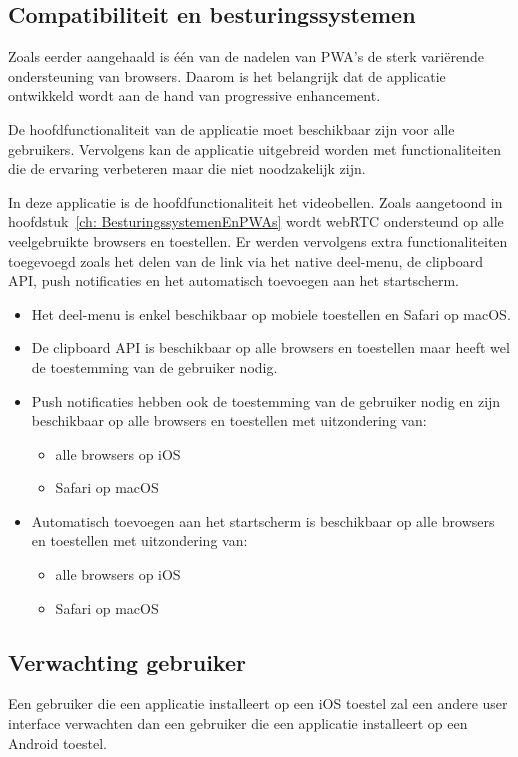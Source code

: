 	\subsection{Compatibiliteit en besturingssystemen}
		Zoals eerder aangehaald is één van de nadelen van PWA's de sterk variërende ondersteuning van browsers. Daarom is het belangrijk dat de applicatie ontwikkeld wordt aan de hand van progressive enhancement. 
		
		De hoofdfunctionaliteit van de applicatie moet beschikbaar zijn voor alle gebruikers. Vervolgens kan de applicatie uitgebreid worden met functionaliteiten die de ervaring verbeteren maar die niet noodzakelijk zijn.
		
		In deze applicatie is de hoofdfunctionaliteit het videobellen. Zoals aangetoond in hoofdstuk~\ref{ch: BesturingssystemenEnPWAs} wordt webRTC ondersteund op alle veelgebruikte browsers en toestellen. Er werden vervolgens extra functionaliteiten toegevoegd zoals het delen van de link via het native deel-menu, de clipboard API, push notificaties en het automatisch toevoegen aan het startscherm.
		\begin{itemize}
	  		\item Het deel-menu is enkel beschikbaar op mobiele toestellen en Safari op macOS.
	  		\item De clipboard API is beschikbaar op alle browsers en toestellen maar heeft wel de toestemming van de gebruiker nodig.
	  		\item Push notificaties hebben ook de toestemming van de gebruiker nodig en zijn beschikbaar op alle browsers en toestellen met uitzondering van:
	  				\begin{itemize}
	  			  		\item alle browsers op iOS
	  			  		\item Safari op macOS
	  		 		\end{itemize}	
  			\item Automatisch toevoegen aan het startscherm is beschikbaar op alle browsers en toestellen met uitzondering van:
	  				\begin{itemize}
	  			  		\item alle browsers op iOS
	  			  		\item Safari op macOS
	  		 		\end{itemize}	
 		\end{itemize}
 		
	\newpage		
	\subsection{Verwachting gebruiker}
		Een gebruiker die een applicatie installeert op een iOS toestel zal een andere user interface verwachten dan een gebruiker die een applicatie installeert op een Android toestel.
		
